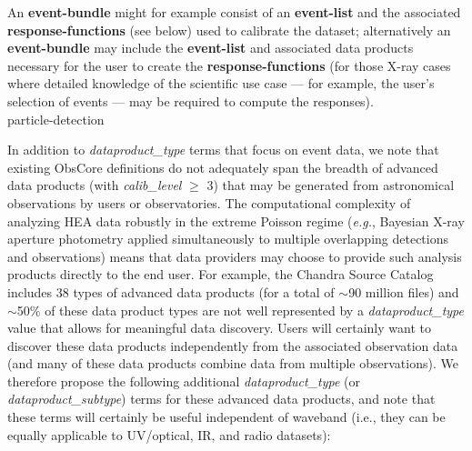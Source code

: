 \documentclass[11pt,a4paper]{ivoa}
\begin{document}
An {\bf event-bundle} might for example consist of an {\bf event-list} and the associated {\bf response-functions} (see below) used to calibrate the dataset; alternatively an {\bf event-bundle} may include the {\bf event-list} and associated  data products necessary for the user to create the {\bf response-functions} (for those X-ray cases where detailed knowledge of the scientific use case — for example, the user’s selection of events — may be required to compute the responses).\\
particle-detection

In addition to {\em dataproduct\_type} terms that focus on event data, we note that existing ObsCore definitions do not adequately span the breadth of advanced data products (with {\em calib\_level} $\ge$ 3) that may be generated from astronomical observations by users or observatories. The computational complexity of analyzing \gls{HEA} data robustly in the extreme Poisson regime ({\em e.g.\/}, Bayesian X-ray aperture photometry applied simultaneously to multiple overlapping detections and observations) means that data providers may choose to provide such analysis products directly to the end user. For example, the Chandra Source Catalog includes 38 types of advanced data products (for a total of $\sim$90 million files) and $\sim$50\% of these data product types are not well represented by a  {\em dataproduct\_type} value that allows for meaningful data discovery. Users will certainly want to discover these data products independently from the associated observation data (and many of these data products combine data from multiple observations). We therefore propose the following additional {\em dataproduct\_type} (or {\em dataproduct\_subtype}) terms for these advanced data products, and note that these terms will certainly be useful independent of waveband (i.e., they can be equally applicable to UV/optical, IR, and radio datasets):
\end{document}
